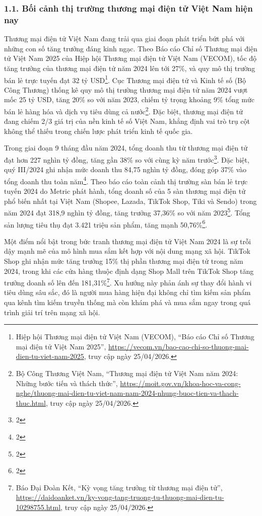 \subsubsection{1.1. Bối cảnh thị trường thương mại điện tử Việt Nam hiện
nay}\label{bux1ed1i-cux1ea3nh-thux1ecb-trux1b0ux1eddng-thux1b0ux1a1ng-mux1ea1i-ux111iux1ec7n-tux1eed-viux1ec7t-nam-hiux1ec7n-nay}

Thương mại điện tử Việt Nam đang trải qua giai đoạn phát triển bứt phá
với những con số tăng trưởng đáng kinh ngạc. Theo Báo cáo Chỉ số Thương
mại điện tử Việt Nam 2025 của Hiệp hội Thương mại điện tử Việt Nam
(VECOM), tốc độ tăng trưởng của thương mại điện tử năm 2024 lên tới
27\%, và quy mô thị trường bán lẻ trực tuyến đạt 32 tỷ USD\footnote{Hiệp
  hội Thương mại điện tử Việt Nam (VECOM), ``Báo cáo Chỉ số Thương mại
  điện tử Việt Nam 2025'',
  \url{https://vecom.vn/bao-cao-chi-so-thuong-mai-dien-tu-viet-nam-2025},
  truy cập ngày 25/04/2026.}. Cục Thương mại điện tử và Kinh tế số (Bộ
Công Thương) thống kê quy mô thị trường thương mại điện tử năm 2024 vượt
mốc 25 tỷ USD, tăng 20\% so với năm 2023, chiếm tỷ trọng khoảng 9\% tổng
mức bán lẻ hàng hóa và dịch vụ tiêu dùng cả nước\footnote{Bộ Công Thương
  Việt Nam, ``Thương mại điện tử Việt Nam năm 2024: Những bước tiến và
  thách thức'',
  \url{https://moit.gov.vn/khoa-hoc-va-cong-nghe/thuong-mai-dien-tu-viet-nam-nam-2024-nhung-buoc-tien-va-thach-thuc.html},
  truy cập ngày 25/04/2026.}. Đặc biệt, thương mại điện tử đang chiếm
2/3 giá trị của nền kinh tế số Việt Nam, khẳng định vai trò trụ cột
không thể thiếu trong chiến lược phát triển kinh tế quốc gia.

Trong giai đoạn 9 tháng đầu năm 2024, tổng doanh thu từ thương mại điện
tử đạt hơn 227 nghìn tỷ đồng, tăng gần 38\% so với cùng kỳ năm
trước\footnote{2}. Đặc biệt, quý III/2024 ghi nhận mức doanh thu 84,75
nghìn tỷ đồng, đóng góp 37\% vào tổng doanh thu toàn năm\footnote{2}.
Theo báo cáo toàn cảnh thị trường sàn bán lẻ trực tuyến 2024 do Metric
phát hành, tổng doanh số của 5 sàn thương mại điện tử phổ biến nhất tại
Việt Nam (Shopee, Lazada, TikTok Shop, Tiki và Sendo) trong năm 2024 đạt
318,9 nghìn tỷ đồng, tăng trưởng 37,36\% so với năm 2023\footnote{2}.
Tổng sản lượng tiêu thụ đạt 3.421 triệu sản phẩm, tăng mạnh
50,76\%\footnote{2}.

Một điểm nổi bật trong bức tranh thương mại điện tử Việt Nam 2024 là sự
trỗi dậy mạnh mẽ của mô hình mua sắm kết hợp với nội dung mạng xã hội.
TikTok Shop ghi nhận mức tăng trưởng 15\% thị phần thương mại điện tử
trong năm 2024, trong khi các cửa hàng thuộc định dạng Shop Mall trên
TikTok Shop tăng trưởng doanh số lên đến 181,31\%\footnote{Báo Đại Đoàn
  Kết, ``Kỳ vọng tăng trưởng từ thương mại điện tử'',
  \url{https://daidoanket.vn/ky-vong-tang-truong-tu-thuong-mai-dien-tu-10298755.html},
  truy cập ngày 25/04/2026.}. Xu hướng này phản ánh sự thay đổi hành vi
tiêu dùng sâu sắc, đó là người mua hàng hiện đại không chỉ tìm kiếm sản
phẩm qua kênh tìm kiếm truyền thống mà còn khám phá và mua sắm ngay
trong quá trình giải trí trên mạng xã hội.

